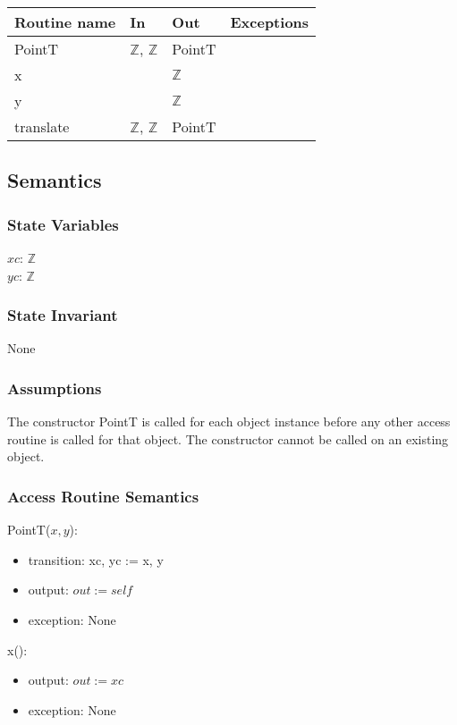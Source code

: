 \documentclass[12pt]{article}
\begin{document}
\begin{tabular}{| l | l | l | l |}
\hline
\textbf{Routine name} & \textbf{In} & \textbf{Out} & \textbf{Exceptions}\\
\hline
PointT & $\mathbb{Z}$, $\mathbb{Z}$ & PointT & \\
\hline
x & ~ & $\mathbb{Z}$ & ~\\
\hline
y & ~ & $\mathbb{Z}$ & ~\\
\hline
translate & $\mathbb{Z}$, $\mathbb{Z}$ & PointT & ~\\
\hline
\end{tabular}

\subsection* {Semantics}

\subsubsection* {State Variables}

$xc$: $\mathbb{Z}$\\
$yc$: $\mathbb{Z}$

\subsubsection* {State Invariant}

None

\subsubsection* {Assumptions}

The constructor PointT is called for each object instance before any other
access routine is called for that object.  The constructor cannot be called on
an existing object.

\subsubsection* {Access Routine Semantics}

PointT($x, y$):
\begin{itemize}
\item transition: xc, yc := x, y
\item output: $out := \mathit{self}$
\item exception: None
\end{itemize}

\noindent x():
\begin{itemize}
\item output: $out := xc$
\item exception: None
\end{itemize}
\end{document}
